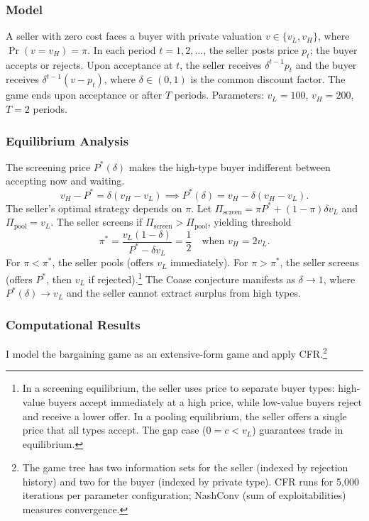 \subsubsection{Model}

A seller with zero cost faces a buyer with private valuation $v \in \{v_L, v_H\}$, where $\Pr(v = v_H) = \pi$. In each period $t = 1, 2, \ldots$, the seller posts price $p_t$; the buyer accepts or rejects. Upon acceptance at $t$, the seller receives $\delta^{t-1} p_t$ and the buyer receives $\delta^{t-1}(v - p_t)$, where $\delta \in (0,1)$ is the common discount factor. The game ends upon acceptance or after $T$ periods. Parameters: $v_L = 100$, $v_H = 200$, $T = 2$ periods.

\subsubsection{Equilibrium Analysis}

The screening price $P^*(\delta)$ makes the high-type buyer indifferent between accepting now and waiting.
\begin{equation}
v_H - P^* = \delta(v_H - v_L) \implies P^*(\delta) = v_H - \delta(v_H - v_L).
\end{equation}
The seller's optimal strategy depends on $\pi$. Let $\Pi_{\text{screen}} = \pi P^* + (1-\pi)\delta v_L$ and $\Pi_{\text{pool}} = v_L$. The seller screens if $\Pi_{\text{screen}} > \Pi_{\text{pool}}$, yielding threshold
\begin{equation}
\pi^* = \frac{v_L(1-\delta)}{P^* - \delta v_L} = \frac{1}{2} \quad \text{when } v_H = 2v_L.
\end{equation}
For $\pi < \pi^*$, the seller pools (offers $v_L$ immediately). For $\pi > \pi^*$, the seller screens (offers $P^*$, then $v_L$ if rejected).\footnote{In a screening equilibrium, the seller uses price to separate buyer types: high-value buyers accept immediately at a high price, while low-value buyers reject and receive a lower offer. In a pooling equilibrium, the seller offers a single price that all types accept. The gap case ($0 = c < v_L$) guarantees trade in equilibrium.} The Coase conjecture manifests as $\delta \to 1$, where $P^*(\delta) \to v_L$ and the seller cannot extract surplus from high types.

\subsubsection{Computational Results}

I model the bargaining game as an extensive-form game and apply CFR.\footnote{The game tree has two information sets for the seller (indexed by rejection history) and two for the buyer (indexed by private type). CFR runs for 5,000 iterations per parameter configuration; NashConv (sum of exploitabilities) measures convergence.}

